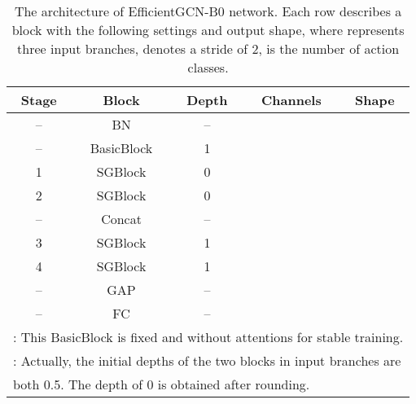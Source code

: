 \documentclass[10pt,journal,compsoc]{IEEEtran}
\begin{document}
\begin{table}[ht]
  \vspace{-0.2cm}
  \caption{The architecture of EfficientGCN-B0 network. Each row describes a block with the following settings and output shape, where  represents three input branches,  denotes a stride of 2,  is the number of action classes.}
  \label{tab:architecture0}
  \vspace{-0.4cm}
  \centering
  \setlength{\tabcolsep}{4pt}
  \renewcommand{\arraystretch}{1.2}
  \begin{tabular}{ccccc}
  \toprule
  Stage & Block & Depth & Channels & Shape \\
  \midrule
  -- & BN & -- &  &  \\
  -- & BasicBlock & 1 &  &  \\
  \hline
  1 & SGBlock & 0 &  &  \\
  2 & SGBlock & 0 &  &  \\
  \hline
  -- & Concat & -- &  &  \\
  \hline
  3 & SGBlock & 1 &  &  \\
  4 & SGBlock & 1 &  &  \\
  \hline
  -- & GAP & -- &  &  \\
  \hline
  -- & FC & -- &  &  \\
  \bottomrule
  \multicolumn{5}{l}{: This BasicBlock is fixed and without attentions for stable training.}\\
  \multicolumn{5}{l}{: Actually, the initial depths of the two blocks in input branches are}\\
  \multicolumn{5}{l}{both 0.5. The depth of 0 is obtained after rounding.}\\
  \end{tabular}
  \vspace{-0.2cm}
\end{table}
\end{document}
